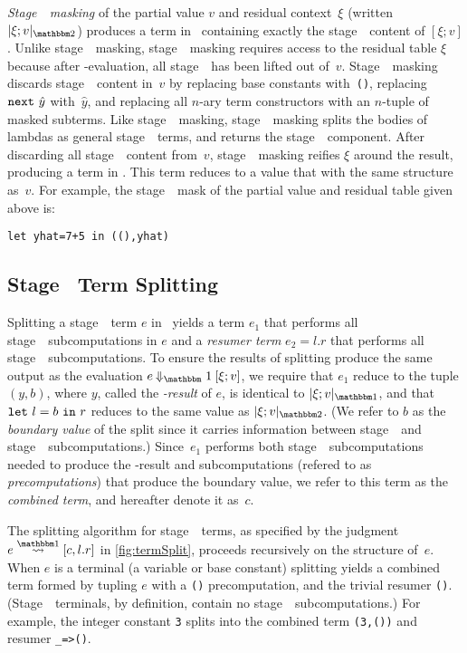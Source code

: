 \emph{Stage~\bbtwo\ masking} of the partial value $v$ and residual context~$\xi$ (written $\maskt{\xi;v}$) produces a term in \langmono\ containing
exactly the stage~\bbtwo\ content of $[\xi;v]$. Unlike stage~\bbone\ masking, stage~\bbtwo\ masking 
requires access to the residual table $\xi$ because after \bbone-evaluation, all stage~\bbtwo\
has been lifted out of~$v$. Stage~\bbtwo\ masking discards
stage~\bbone\ content in~$v$ by replacing base constants with~\texttt{()},
replacing ${\tt next}~\hat{y}$ with~$\hat{y}$, and replacing all $n$-ary term
constructors with an $n$-tuple of masked subterms. Like stage~\bbone\ masking, stage~\bbtwo\
masking splits the bodies of lambdas as general stage~\bbone\ terms, and
returns the stage~\bbtwo\ component. After discarding all stage~\bbone\ content from~$v$, stage~\bbtwo\ masking reifies $\xi$ around the result,
producing a term in \langmono. This term reduces to a value that with the same structure as~$v$.
For example, the stage~\bbtwo\ mask of the partial value and residual table given above is:
\begin{lstlisting}
let yhat=7+5 in ((),yhat)
\end{lstlisting}

\subsection{Stage \bbone\ Term Splitting}
\label{sec:split-one}

Splitting a stage~\bbone\ term $e$ in \lang\ yields a term 
$e_1$ that performs all stage~\bbone\ subcomputations in $e$ and a \emph{resumer term} $e_2 = l.r$ that performs all stage~\bbtwo\ subcomputations.
To ensure the results of splitting produce the same output as the evaluation $e\mathbin{\redonesym}[\xi;v]$,
we require that $e_1$ reduce to the tuple $(y,b)$,
where $y$, called the \emph{\bbone-result} of $e$, is identical to $\masko{\xi;v}$, and that
${\tt let}~{l} = {b}~{\tt in}~{r}$ reduces to the same value as $\maskt{\xi;v}$. (We refer to $b$ as the \emph{boundary value} of the split since it carries information between stage~\bbone\ and stage~\bbtwo\ subcomputations.) Since~$e_1$ performs both stage~\bbone\ subcomputations needed to produce the \bbone-result and subcomputations (refered to as \emph{precomputations}) that produce the boundary value, we refer to this term as the \emph{combined term}, and hereafter denote it as~$c$.

The splitting algorithm for stage~\bbone\ terms, as specified by the
judgment $e \splitonesym [c,l.r]$ in \cref{fig:termSplit}, proceeds
recursively on the structure of~$e$.
When $e$ is a terminal (a variable or base constant)
splitting yields a combined term formed by tupling $e$ with a \texttt{()} precomputation, and the trivial resumer \texttt{()}. (Stage~\bbone\ terminals, by definition, contain no stage~\bbtwo\ subcomputations.)  For example, the integer constant \texttt{3} splits into the combined term \texttt{(3,())} and resumer \texttt{\_=>()}.

